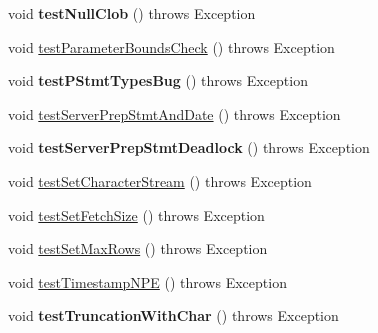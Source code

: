 \begin{DoxyCompactItemize}
\item 
\mbox{\label{classtestsuite_1_1regression_1_1_statement_regression_test_a42412d8d0c74debc967e563a49d2cd6b}} 
void {\bfseries test\+Null\+Clob} ()  throws Exception 
\item 
void \mbox{\hyperlink{classtestsuite_1_1regression_1_1_statement_regression_test_a65351d4c69ec3d81977aabf6069fa827}{test\+Parameter\+Bounds\+Check}} ()  throws Exception 
\item 
\mbox{\label{classtestsuite_1_1regression_1_1_statement_regression_test_a548c9a5b159033c75ac681a3272558d6}} 
void {\bfseries test\+P\+Stmt\+Types\+Bug} ()  throws Exception 
\item 
void \mbox{\hyperlink{classtestsuite_1_1regression_1_1_statement_regression_test_a95273398ebb6f8ab8e39d8ab7d7d7ec2}{test\+Server\+Prep\+Stmt\+And\+Date}} ()  throws Exception 
\item 
\mbox{\label{classtestsuite_1_1regression_1_1_statement_regression_test_ae4419816a2cf52c9d2e3fe03f6965538}} 
void {\bfseries test\+Server\+Prep\+Stmt\+Deadlock} ()  throws Exception 
\item 
void \mbox{\hyperlink{classtestsuite_1_1regression_1_1_statement_regression_test_a8043401e658d50f132bd6407926ed1f6}{test\+Set\+Character\+Stream}} ()  throws Exception 
\item 
void \mbox{\hyperlink{classtestsuite_1_1regression_1_1_statement_regression_test_a94ba62e42c45e2025b030f3a7f69ea17}{test\+Set\+Fetch\+Size}} ()  throws Exception 
\item 
void \mbox{\hyperlink{classtestsuite_1_1regression_1_1_statement_regression_test_a81fe072b5269fee8c61a3391538282c2}{test\+Set\+Max\+Rows}} ()  throws Exception 
\item 
void \mbox{\hyperlink{classtestsuite_1_1regression_1_1_statement_regression_test_adddbda10c165cfaf7d3ae1266e7a66ab}{test\+Timestamp\+N\+PE}} ()  throws Exception 
\item 
\mbox{\label{classtestsuite_1_1regression_1_1_statement_regression_test_aafc5cbe7d1a8aa3033e86c9f0cd8c08a}} 
void {\bfseries test\+Truncation\+With\+Char} ()  throws Exception 
\item 

\end{DoxyCompactItemize}
